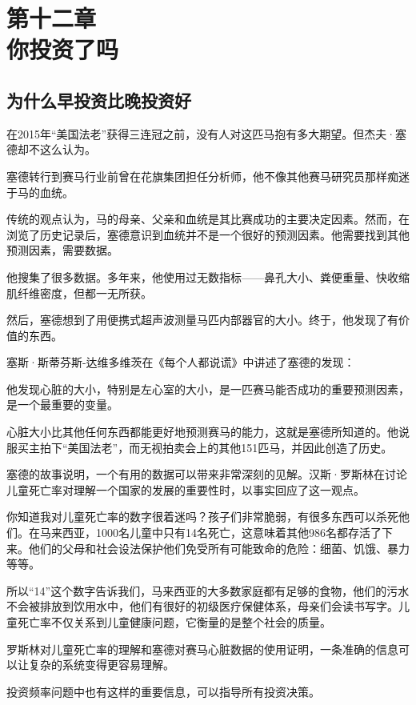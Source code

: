 \section[第十二章\q 你投资了吗]{第十二章\\ 你投资了吗}
\renewcommand{\bookchapter}{12}
\setcounter{figure}{0}
\setcounter{table}{0}
\subsection{为什么早投资比晚投资好}
在2015年“美国法老”获得三连冠之前，没有人对这匹马抱有多大期望。但杰夫·塞德却不这么认为。

塞德转行到赛马行业前曾在花旗集团担任分析师，他不像其他赛马研究员那样痴迷于马的血统。

传统的观点认为，马的母亲、父亲和血统是其比赛成功的主要决定因素。然而，在浏览了历史记录后，塞德意识到血统并不是一个很好的预测因素。他需要找到其他预测因素，需要数据。

他搜集了很多数据。多年来，他使用过无数指标——鼻孔大小、粪便重量、快收缩肌纤维密度，但都一无所获。

然后，塞德想到了用便携式超声波测量马匹内部器官的大小。终于，他发现了有价值的东西。

塞斯·斯蒂芬斯-达维多维茨在《每个人都说谎》中讲述了塞德的发现：

他发现心脏的大小，特别是左心室的大小，是一匹赛马能否成功的重要预测因素，是一个最重要的变量。

心脏大小比其他任何东西都能更好地预测赛马的能力，这就是塞德所知道的。他说服买主拍下“美国法老”，而无视拍卖会上的其他151匹马，并因此创造了历史。

塞德的故事说明，一个有用的数据可以带来非常深刻的见解。汉斯·罗斯林在讨论儿童死亡率对理解一个国家的发展的重要性时，以事实回应了这一观点。

你知道我对儿童死亡率的数字很着迷吗？孩子们非常脆弱，有很多东西可以杀死他们。在马来西亚，1000名儿童中只有14名死亡，这意味着其他986名都存活了下来。他们的父母和社会设法保护他们免受所有可能致命的危险：细菌、饥饿、暴力等等。

所以“14”这个数字告诉我们，马来西亚的大多数家庭都有足够的食物，他们的污水不会被排放到饮用水中，他们有很好的初级医疗保健体系，母亲们会读书写字。儿童死亡率不仅关系到儿童健康问题，它衡量的是整个社会的质量。

罗斯林对儿童死亡率的理解和塞德对赛马心脏数据的使用证明，一条准确的信息可以让复杂的系统变得更容易理解。

投资频率问题中也有这样的重要信息，可以指导所有投资决策。


